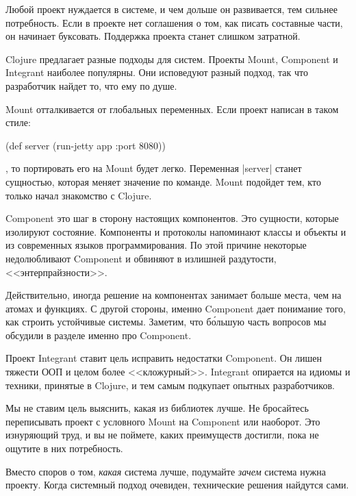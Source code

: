 Любой проект нуждается в системе, и чем дольше он развивается, тем сильнее
потребность. Если в проекте нет соглашения о том, как писать составные части, он
начинает буксовать. Поддержка проекта станет слишком затратной.

Clojure предлагает разные подходы для систем. Проекты Mount, Component и
Integrant наиболее популярны. Они исповедуют разный подход, так что разработчик
найдет то, что ему по душе.

Mount отталкивается от глобальных переменных. Если проект написан в таком стиле:

\begin{english}
  \begin{clojure}
(def server (run-jetty app {:port 8080}))
  \end{clojure}
\end{english}

\noindent
, то портировать его на Mount будет легко. Переменная \spverb|server| станет
сущностью, которая меняет значение по команде. Mount подойдет тем, кто только
начал знакомство с Clojure.

Component это шаг в сторону настоящих компонентов. Это сущности, которые
изолируют состояние. Компоненты и протоколы напоминают классы и объекты и из
современных языков программирования. По этой причине некоторые недолюбливают
Component и обвиняют в излишней раздутости, <<энтерпрайзности>>.

Действительно, иногда решение на компонентах занимает больше места, чем на
атомах и функциях. С другой стороны, именно Component дает понимание того, как
строить устойчивые системы. Заметим, что б\'{о}льшую часть вопросов мы обсудили
в разделе именно про Component.

Проект Integrant ставит цель исправить недостатки Component. Он лишен тяжести
ООП и целом более <<кложурный>>. Integrant опирается на идиомы и техники,
принятые в Clojure, и тем самым подкупает опытных разработчиков.

Мы не ставим цель выяснить, какая из библиотек лучше. Не бросайтесь переписывать
проект с условного Mount на Component или наоборот. Это изнуряющий труд, и вы не
поймете, каких преимуществ достигли, пока не ощутите в них потребность.

Вместо споров о том, \emph{какая} система лучше, подумайте \emph{зачем} система
нужна проекту. Когда системный подход очевиден, технические решения найдутся
сами.
